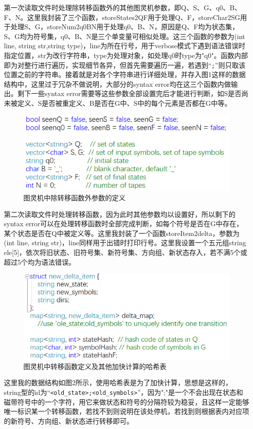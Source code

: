 \documentclass[UTF8]{article}
\begin{document}
第一次读取文件时处理除转移函数外的其他图灵机参数，即Q、S、G、q0、B、F、N。这里我封装了三个函数，storeStates2QF用于处理Q、F，storeChar2SG用于处理S、G，storeNum2q0BN用于处理q0、B、N，原因是Q、F均为状态集，S、G均为符号集，q0、B、N是三个单变量可相似处理。这三个函数的参数为(int line, string str,string type)，line为所在行号，用于verbose模式下遇到语法错误时指定位置，str为改行字符串，type为处理对象，如处理q0时type为"q0"。函数内部即为对整行进行遍历，实现细节各异，但首先需要遍历一遍，若遇到``\verb|;|''则只取该位置之前的字符串。接着就是对各个字符串进行详细处理，并存入图1这样的数据结构中，这里过于冗杂不做说明，大部分的syntax error均在这三个函数内做输出。剩下一些syntax error需要等这些参数全部设置完后才能进行判断，如S是否尚未被定义、S是否被重定义、B是否在G中、S中的每个元素是否都在G中等。
\begin{figure}[h]
  \centering
  \includegraphics[scale=0.6]{pic1.png}
  \caption{图灵机中除转移函数外参数的定义}
\end{figure}

第二次读取文件时处理转移函数，因为此时其他参数均以设置好，所以剩下的syntax error可以在处理转移函数时全部完成判断，如每个符号是否在G中存在，某个状态是否在Q中被定义等。这里我封装了一个函数storeItem2delta，参数为(int line, string str)，line同样用于出错时打印行号。这里我设置一个五元组string ele[5]，依次将旧状态、旧符号集、新符号集、方向组、新状态存入，若不满5个或超过5个均为语法错误。
\begin{figure}[h]
  \centering
  \includegraphics[scale=0.6]{pic2.png}
  \caption{图灵机中转移函数定义及其他加快计算的哈希表}
\end{figure}
这里我的数据结构如图2所示，使用哈希表是为了加快计算，思想是这样的，string型的id为``\verb|<old_state>;<old_symbols>|''，因为";"是一个不会出现在状态和磁带符号中的一个字符，用它来做状态和符号的分隔符较为稳妥，且这样一定能够唯一标识某一个转移函数，若找不到则说明在该处停机，若找到则根据表内对应项的新符号、方向组、新状态进行转移即可。
\end{document}

